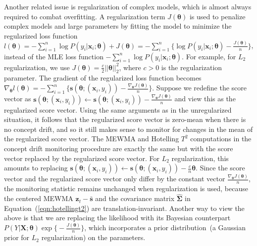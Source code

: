 \documentclass[twoside,11pt]{article}
\begin{document}
Another related issue is regularization of complex models, which is almost always required to combat overfitting. A regularization term $J(\bm{\theta})$ is used to penalize complex models and large parameters by fitting the model to minimize the regularized loss function $l(\bm{\theta}) = -\sum_{i=1}^n \log P(y_i|\bm{x}_i;\bm{\theta}) + J(\bm{\theta}) = - \sum_{i=1}^n \big\{ \log P(y_i|\bm{x}_i;\bm{\theta}) - \frac{J(\bm{\theta})}{n}\big\}$, instead of the MLE loss function $-\sum_{i=1}^n \log P(y_i|\bm{x}_i;\bm{\theta})$. For example, for $L_2$ regularization, we use $J(\bm{\theta}) = \frac{c}{2}||\bm{\theta}||_2^2$, where $c>0$ is the regularization parameter. The gradient of the regularized loss function becomes $\nabla_{\bm{\theta}}l(\bm{\theta}) = - \sum_{i=1}^n \big\{ \bm{s}(\bm{\theta};(\bm{x}_i,y_i))-\frac{\nabla_{\bm{\theta}}J(\bm{\theta})}{n} \big\}$. Suppose we redefine the score vector as $\bm{s}(\bm{\theta};(\bm{x}_i,y_i)) \leftarrow \bm{s}(\bm{\theta};(\bm{x}_i,y_i)) -\frac{\nabla_{\bm{\theta}}J(\bm{\theta})}{n}$ and view this as the regularized score vector. Using the same arguments as in the unregularized situation, it follows that the regularized score vector is zero-mean when there is no concept drift, and so it still makes sense to monitor for changes in the mean of the regularized score vector. The MEWMA and Hotelling $T^2$ computations in the concept drift monitoring procedure are exactly the same but with the score vector replaced by the regularized score vector. For $L_2$ regularization, this amounts to replacing $\bm{s}(\bm{\theta};(\bm{x}_i,y_i)) \leftarrow \bm{s}(\bm{\theta};(\bm{x}_i,y_i)) - \frac{c}{n}\bm{\theta}$. Since the score vector and the regularized score vector only differ by the constant vector $\frac{\nabla_{\bm{\theta}}J(\bm{\theta})}{n}$, the monitoring statistic remains unchanged when regularization is used, because the centered MEWMA $\bm {z}_t-\bar { \bm {s}}$ and the covariance matrix $\widehat {\bm{\Sigma}}$ in Equation~(\ref{eqn:hotellingt2}) are translation-invariant. Another way to view the above is that we are replacing the likelihood with its Bayesian counterpart $P(Y|\bm{X};\bm{\theta})\exp\big\{-\frac{J(\bm{\theta})}{n}\big\}$, which incorporates a prior distribution~(a Gaussian prior for $L_2$ regularization) on the parameters.
\end{document}
